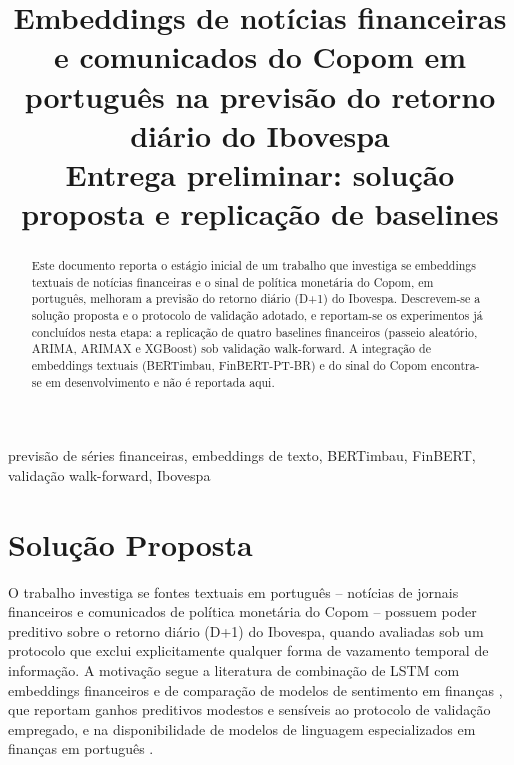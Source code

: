 \documentclass[conference]{IEEEtran}
\begin{document}
\title{Embeddings de not\'icias financeiras e comunicados do Copom em portugu\^es na previs\~ao do retorno di\'ario do Ibovespa\\\large Entrega preliminar: solu\c{c}\~ao proposta e replica\c{c}\~ao de baselines}

\author{
}

\maketitle

\begin{abstract}
Este documento reporta o est\'agio inicial de um trabalho que investiga se embeddings textuais de not\'icias financeiras e o sinal de pol\'itica monet\'aria do Copom, em portugu\^es, melhoram a previs\~ao do retorno di\'ario (D+1) do Ibovespa. Descrevem-se a solu\c{c}\~ao proposta e o protocolo de valida\c{c}\~ao adotado, e reportam-se os experimentos j\'a conclu\'idos nesta etapa: a replica\c{c}\~ao de quatro baselines financeiros (passeio aleat\'orio, ARIMA, ARIMAX e XGBoost) sob valida\c{c}\~ao walk-forward. A integra\c{c}\~ao de embeddings textuais (BERTimbau, FinBERT-PT-BR) e do sinal do Copom encontra-se em desenvolvimento e n\~ao \'e reportada aqui.
\end{abstract}

\begin{IEEEkeywords}
previs\~ao de s\'eries financeiras, embeddings de texto, BERTimbau, FinBERT, valida\c{c}\~ao walk-forward, Ibovespa
\end{IEEEkeywords}

\section{Solu\c{c}\~ao Proposta}
\label{sec:solucao}

O trabalho investiga se fontes textuais em portugu\^es -- not\'icias de jornais financeiros e comunicados de pol\'itica monet\'aria do Copom -- possuem poder preditivo sobre o retorno di\'ario (D+1) do Ibovespa, quando avaliadas sob um protocolo que exclui explicitamente qualquer forma de vazamento temporal de informa\c{c}\~ao. A motiva\c{c}\~ao segue a literatura de combina\c{c}\~ao de LSTM com embeddings financeiros \cite{gu2024finbertlstm} e de compara\c{c}\~ao de modelos de sentimento em finan\c{c}as \cite{dahal2023comparative}, que reportam ganhos preditivos modestos e sens\'iveis ao protocolo de valida\c{c}\~ao empregado, e na disponibilidade de modelos de linguagem especializados em finan\c{c}as em portugu\^es \cite{araci2019finbert}.
\end{document}
